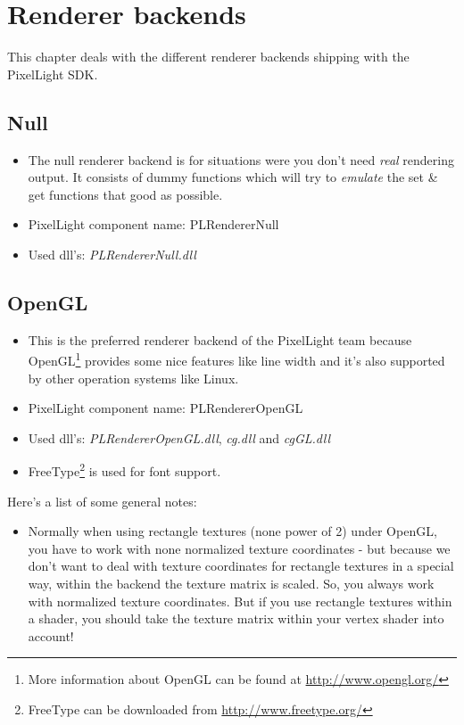 \chapter{Renderer backends}
This chapter deals with the different renderer backends shipping with the PixelLight SDK.




\section{Null}
\begin{itemize}
\item The null renderer backend is for situations were you don't need \emph{real} rendering output. It consists of dummy functions which will try to \emph{emulate} the set \& get functions that good as possible.
\item PixelLight component name: PLRendererNull
\item Used dll's: \emph{PLRendererNull.dll}
\end{itemize}




\section{OpenGL}
\begin{itemize}
\item This is the preferred renderer backend of the PixelLight team because OpenGL\footnote{More information about OpenGL can be found at \url{http://www.opengl.org/}} provides some nice features like line width and it's also supported by other operation systems like Linux.
\item PixelLight component name: PLRendererOpenGL
\item Used dll's: \emph{PLRendererOpenGL.dll}, \emph{cg.dll} and \emph{cgGL.dll}
\item FreeType\footnote{FreeType can be downloaded from \url{http://www.freetype.org/}} is used for font support.
\end{itemize}

Here's a list of some general notes:
\begin{itemize}
\item Normally when using rectangle textures (none power of 2) under OpenGL, you have to work with none normalized texture coordinates - but because we don't want to deal with texture coordinates for rectangle textures in a special way, within the backend the texture matrix is scaled. So, you always work with normalized texture coordinates. But if you use rectangle textures within a shader, you should take the texture matrix within your vertex shader into account!
\end{itemize}




